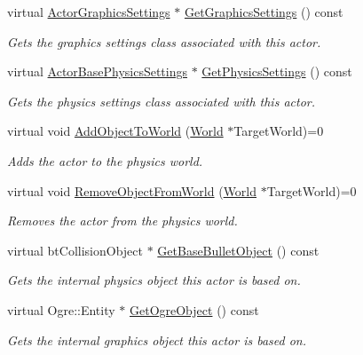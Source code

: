 \begin{DoxyCompactItemize}
virtual \hyperlink{classphys_1_1ActorGraphicsSettings}{ActorGraphicsSettings} $\ast$ \hyperlink{classphys_1_1ActorBase_a90cdbb9e0d01e9ab0cbac24ff8891e1c}{GetGraphicsSettings} () const 
\begin{DoxyCompactList}\small\item\em Gets the graphics settings class associated with this actor. \item\end{DoxyCompactList}\item 
virtual \hyperlink{classphys_1_1ActorBasePhysicsSettings}{ActorBasePhysicsSettings} $\ast$ \hyperlink{classphys_1_1ActorBase_ab320de95c769822766207e20ac2cd16d}{GetPhysicsSettings} () const 
\begin{DoxyCompactList}\small\item\em Gets the physics settings class associated with this actor. \item\end{DoxyCompactList}\item 
virtual void \hyperlink{classphys_1_1ActorBase_a3d28e4c4a33f50210101695cb33ded3b}{AddObjectToWorld} (\hyperlink{classphys_1_1World}{World} $\ast$TargetWorld)=0
\begin{DoxyCompactList}\small\item\em Adds the actor to the physics world. \item\end{DoxyCompactList}\item 
virtual void \hyperlink{classphys_1_1ActorBase_aaa787de7ec5d7d1d8428ea78f37bcb40}{RemoveObjectFromWorld} (\hyperlink{classphys_1_1World}{World} $\ast$TargetWorld)=0
\begin{DoxyCompactList}\small\item\em Removes the actor from the physics world. \item\end{DoxyCompactList}\item 
virtual btCollisionObject $\ast$ \hyperlink{classphys_1_1ActorBase_abc72866a25bcff3b73a1d61c9acb2f76}{GetBaseBulletObject} () const 
\begin{DoxyCompactList}\small\item\em Gets the internal physics object this actor is based on. \item\end{DoxyCompactList}\item 
virtual Ogre::Entity $\ast$ \hyperlink{classphys_1_1ActorBase_ad91615975e0dd7b2aaac8fa002686ef2}{GetOgreObject} () const 
\begin{DoxyCompactList}\small\item\em Gets the internal graphics object this actor is based on. \item\end{DoxyCompactList}\item 

\end{DoxyCompactItemize}
